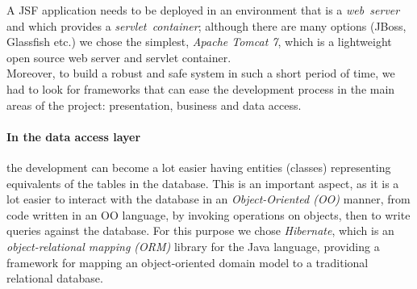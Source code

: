\noindent A JSF application needs to be deployed in an environment that is
a \emph{web~server} and which provides a \emph{servlet~container}; although
there are many options (JBoss, Glassfish etc.) we chose the simplest,
\emph{Apache Tomcat 7}, which is a lightweight open source web server and
servlet container.\\

\noindent Moreover, to build a robust and safe system in
such a short period of time, we had to look for frameworks that can ease the development
process in the main areas of the project: presentation, business and data
access.

\paragraph{In the data access layer} the development can become a lot easier
having entities (classes) representing equivalents of the tables in the database. This
is an important aspect, as it is a lot easier to interact with the database in
an \emph{Object-Oriented (OO)} manner, from code written in an
OO language, by invoking operations on objects, then to write queries against
the database. For this purpose we chose \emph{Hibernate}, which is an 
\emph{object-relational mapping (ORM)} library for the Java language, providing
a framework for mapping an object-oriented domain model to a traditional
relational database.

